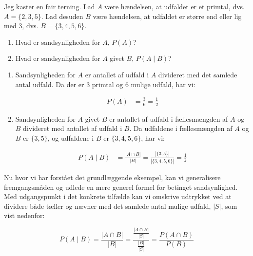 \begin{example}
Jeg kaster en fair terning. Lad \( A \) være hændelsen, at udfaldet er et primtal, dvs. \( A = \{2, 3, 5\} \). Lad desuden \( B \) være hændelsen, at udfaldet er større end eller lig med 3, dvs. \( B = \{3, 4, 5, 6\} \).

\begin{enumerate}[label=(\alph*)]
    \item Hvad er sandsynligheden for \( A \), \( P(A) \)?
    \item Hvad er sandsynligheden for \( A \) givet \( B \), \( P(A \mid B) \)?
\end{enumerate}

\end{example}

\begin{solution}
    \begin{enumerate}[label=(\alph*)]
        \item Sandsynligheden for \( A \) er antallet af udfald i \( A \) divideret med det samlede antal udfald. Da der er 3 primtal og 6 mulige udfald, har vi:
    
        \begin{align*}
            P(A) &= \frac{3}{6} = \frac{1}{2}
        \end{align*}
    
        \item Sandsynligheden for \( A \) givet \( B \) er antallet af udfald i fællesmængden af \( A \) og \( B \) divideret med antallet af udfald i \( B \). Da udfaldene i fællesmængden af \( A \) og \( B \) er \(\{3, 5\}\), og udfaldene i \( B \) er \(\{3, 4, 5, 6\}\), har vi: \vspace{0.4cm}
    
        \begin{align*}
        P(A \mid B) &=\frac{|A \cap B|}{|B|} = \frac{|\{3,5\}|}{|\{3,4, 5, 6\}|} = \frac{1}{2}
        \end{align*}

    \end{enumerate}
\end{solution}

Nu hvor vi har forstået det grundlæggende eksempel, kan vi generalisere fremgangsmåden og udlede en mere generel formel for betinget sandsynlighed. Med udgangspunkt i det konkrete tilfælde kan vi omskrive udtrykket ved at dividere både tæller og nævner med det samlede antal mulige udfald, \( |S| \), som vist nedenfor:

\[
P(A \mid B) = \frac{|A \cap B|}{|B|} = \frac{\frac{|A \cap B|}{|S|}}{\frac{|B|}{|S|}} = \frac{P(A \cap B)}{P(B)}
\]

